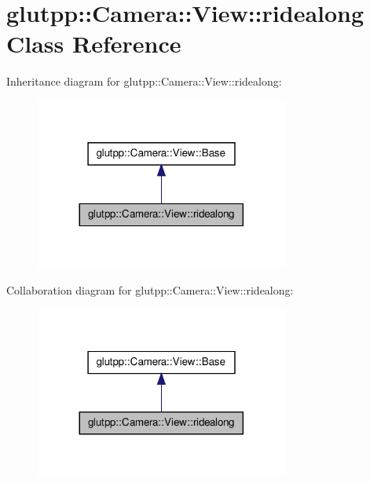 \hypertarget{classglutpp_1_1Camera_1_1View_1_1ridealong}{\section{glutpp\-:\-:\-Camera\-:\-:\-View\-:\-:ridealong \-Class \-Reference}
\label{classglutpp_1_1Camera_1_1View_1_1ridealong}
}


\-Inheritance diagram for glutpp\-:\-:\-Camera\-:\-:\-View\-:\-:ridealong\-:
\nopagebreak
\begin{figure}[H]
\begin{center}
\leavevmode
\includegraphics[width=236pt]{classglutpp_1_1Camera_1_1View_1_1ridealong__inherit__graph}
\end{center}
\end{figure}


\-Collaboration diagram for glutpp\-:\-:\-Camera\-:\-:\-View\-:\-:ridealong\-:
\nopagebreak
\begin{figure}[H]
\begin{center}
\leavevmode
\includegraphics[width=236pt]{classglutpp_1_1Camera_1_1View_1_1ridealong__coll__graph}
\end{center}
\end{figure}
